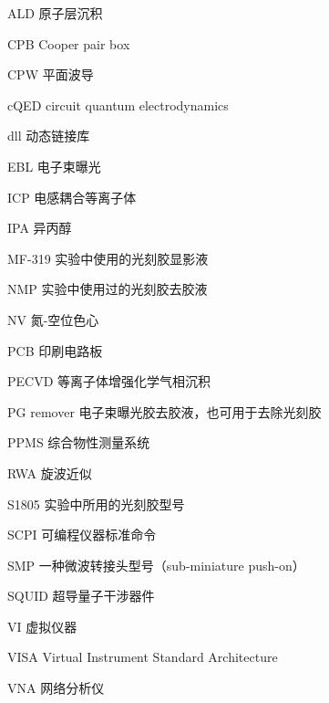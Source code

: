 

\begin{denotation}[3cm]
\item[ALD] 原子层沉积
\item[CPB] Cooper pair box
\item[CPW] 平面波导
\item[cQED] circuit quantum electrodynamics
\item[dll] 动态链接库
\item[EBL] 电子束曝光
\item[ICP] 电感耦合等离子体
\item[IPA] 异丙醇
\item[MF-319] 实验中使用的光刻胶显影液
\item[NMP] 实验中使用过的光刻胶去胶液
\item[NV] 氮-空位色心
\item[PCB] 印刷电路板
\item[PECVD] 等离子体增强化学气相沉积
\item[PG remover] 电子束曝光胶去胶液，也可用于去除光刻胶
\item[PPMS] 综合物性测量系统
\item[RWA] 旋波近似
\item[S1805] 实验中所用的光刻胶型号
\item[SCPI] 可编程仪器标准命令
\item[SMP] 一种微波转接头型号（sub-miniature push-on）
\item[SQUID] 超导量子干涉器件
\item[VI] 虚拟仪器
\item[VISA] Virtual Instrument Standard Architecture
\item[VNA] 网络分析仪
\end{denotation}

